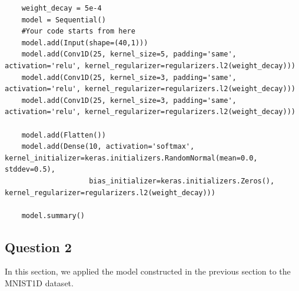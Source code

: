 \documentclass[conference]{IEEEtran}
\begin{document}
\begin{lstlisting}
    weight_decay = 5e-4
    model = Sequential()
    #Your code starts from here 
    model.add(Input(shape=(40,1)))
    model.add(Conv1D(25, kernel_size=5, padding='same', activation='relu', kernel_regularizer=regularizers.l2(weight_decay)))
    model.add(Conv1D(25, kernel_size=3, padding='same', activation='relu', kernel_regularizer=regularizers.l2(weight_decay)))
    model.add(Conv1D(25, kernel_size=3, padding='same', activation='relu', kernel_regularizer=regularizers.l2(weight_decay)))

    model.add(Flatten())
    model.add(Dense(10, activation='softmax', kernel_initializer=keras.initializers.RandomNormal(mean=0.0, stddev=0.5),
                    bias_initializer=keras.initializers.Zeros(), kernel_regularizer=regularizers.l2(weight_decay)))

    model.summary()
\end{lstlisting}

\subsection{Question 2}

In this section, we applied the model constructed in the previous section to the MNIST1D dataset.\par
\end{document}
